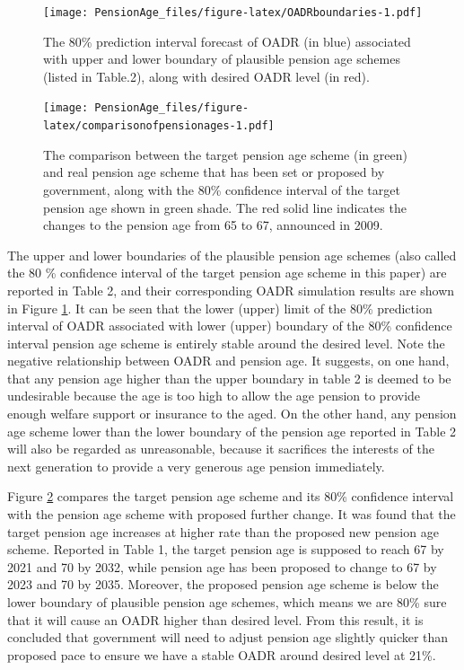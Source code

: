 \documentclass[11pt,a4paper,]{article}
\begin{document}
\begin{figure}
\centering
\texttt{[image: PensionAge\_files/figure-latex/OADRboundaries-1.pdf]}
\caption{\label{fig:OADRboundaries}The 80\% prediction interval forecast of OADR (in blue) associated with upper and lower boundary of plausible pension age schemes (listed in Table.2), along with desired OADR level (in red).}
\end{figure}

\begin{figure}
\centering
\texttt{[image: PensionAge\_files/figure-latex/comparisonofpensionages-1.pdf]}
\caption{\label{fig:comparisonofpensionages}The comparison between the target pension age scheme (in green) and real pension age scheme that has been set or proposed by government, along with the 80\% confidence interval of the target pension age shown in green shade. The red solid line indicates the changes to the pension age from 65 to 67, announced in 2009.}
\end{figure}

The upper and lower boundaries of the plausible pension age schemes (also called the 80 \% confidence interval of the target pension age scheme in this paper) are reported in Table 2, and their corresponding OADR simulation results are shown in Figure \ref{fig:OADRboundaries}. It can be seen that the lower (upper) limit of the 80\% prediction interval of OADR associated with lower (upper) boundary of the 80\% confidence interval pension age scheme is entirely stable around the desired level. Note the negative relationship between OADR and pension age. It suggests, on one hand, that any pension age higher than the upper boundary in table 2 is deemed to be undesirable because the age is too high to allow the age pension to provide enough welfare support or insurance to the aged. On the other hand, any pension age scheme lower than the lower boundary of the pension age reported in Table 2 will also be regarded as unreasonable, because it sacrifices the interests of the next generation to provide a very generous age pension immediately.

Figure \ref{fig:comparisonofpensionages} compares the target pension age scheme and its 80\% confidence interval with the pension age scheme with proposed further change. It was found that the target pension age increases at higher rate than the proposed new pension age scheme. Reported in Table 1, the target pension age is supposed to reach 67 by 2021 and 70 by 2032, while pension age has been proposed to change to 67 by 2023 and 70 by 2035. Moreover, the proposed pension age scheme is below the lower boundary of plausible pension age schemes, which means we are 80\% sure that it will cause an OADR higher than desired level. From this result, it is concluded that government will need to adjust pension age slightly quicker than proposed pace to ensure we have a stable OADR around desired level at 21\%.
\end{document}
